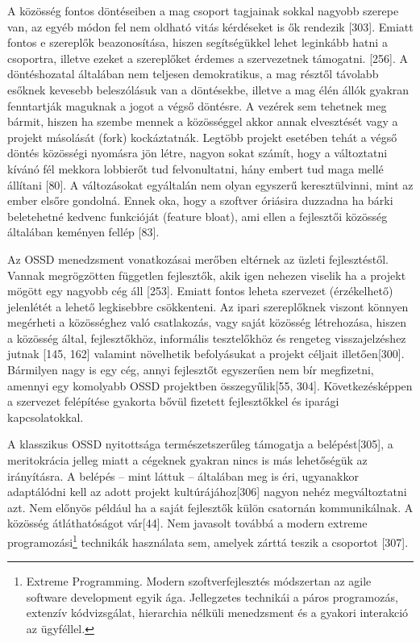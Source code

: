 \documentclass[12pt,magyar,a4paper,oneside]{scrreprt}
\begin{document}
A közösség fontos döntéseiben a mag csoport tagjainak sokkal nagyobb
szerepe van, az egyéb módon fel nem oldható vitás kérdéseket is ők
rendezik {[}303{]}. Emiatt fontos e szereplők beazonosítása, hiszen
segítségükkel lehet leginkább hatni a csoportra, illetve ezeket a
szereplőket érdemes a szervezetnek támogatni. {[}256{]}. A döntéshozatal
általában nem teljesen demokratikus, a mag résztől távolabb esőknek
kevesebb beleszólásuk van a döntésekbe, illetve a mag élén állók gyakran
fenntartják maguknak a jogot a végső döntésre. A vezérek sem tehetnek
meg bármit, hiszen ha szembe mennek a közösséggel akkor annak
elvesztését vagy a projekt másolását (fork) kockáztatnák. Legtöbb
projekt esetében tehát a végső döntés közösségi nyomásra jön létre,
nagyon sokat számít, hogy a változtatni kívánó fél mekkora lobbierőt tud
felvonultatni, hány embert tud maga mellé állítani {[}80{]}. A
változásokat egyáltalán nem olyan egyszerű keresztülvinni, mint az ember
elsőre gondolná. Ennek oka, hogy a szoftver óriásira duzzadna ha bárki
beletehetné kedvenc funkcióját (feature bloat), ami ellen a fejlesztői
közösség általában keményen fellép {[}83{]}.

Az OSSD menedzsment vonatkozásai merőben eltérnek az üzleti
fejlesztéstől. Vannak megrögzötten független fejlesztők, akik igen
nehezen viselik ha a projekt mögött egy nagyobb cég áll {[}253{]}.
Emiatt fontos leheta szervezet (érzékelhető) jelenlétét a lehető
legkisebbre csökkenteni. Az ipari szereplőknek viszont könnyen megérheti
a közösséghez való csatlakozás, vagy saját közösség létrehozása, hiszen
a közösség által, fejlesztőkhöz, informális tesztelőkhöz és rengeteg
visszajelzéshez jutnak {[}145, 162{]} valamint növelhetik befolyásukat a
projekt céljait illetően{[}300{]}. Bármilyen nagy is egy cég, annyi
fejlesztőt egyszerűen nem bír megfizetni, amennyi egy komolyabb OSSD
projektben összegyűlik{[}55, 304{]}. Következésképpen a szervezet
felépítése gyakorta bővül fizetett fejlesztőkkel és iparági
kapcsolatokkal.

A klasszikus OSSD nyitottsága természetszerűleg támogatja a
belépést{[}305{]}, a meritokrácia jelleg miatt a cégeknek gyakran nincs
is más lehetőségük az irányításra. A belépés -- mint láttuk -- általában
meg is éri, ugyanakkor adaptálódni kell az adott projekt
kultúrájához{[}306{]} nagyon nehéz megváltoztatni azt. Nem előnyös
például ha a saját fejlesztők külön csatornán kommunikálnak. A közösség
átláthatóságot vár{[}44{]}. Nem javasolt továbbá a modern extreme
programozási\footnote{Extreme Programming. Modern szoftverfejlesztés
  módszertan az agile software development egyik ága. Jellegzetes
  technikái a páros programozás, extenzív kódvizsgálat, hierarchia
  nélküli menedzsment és a gyakori interakció az ügyféllel.} technikák
használata sem, amelyek zárttá teszik a csoportot {[}307{]}.
\end{document}
